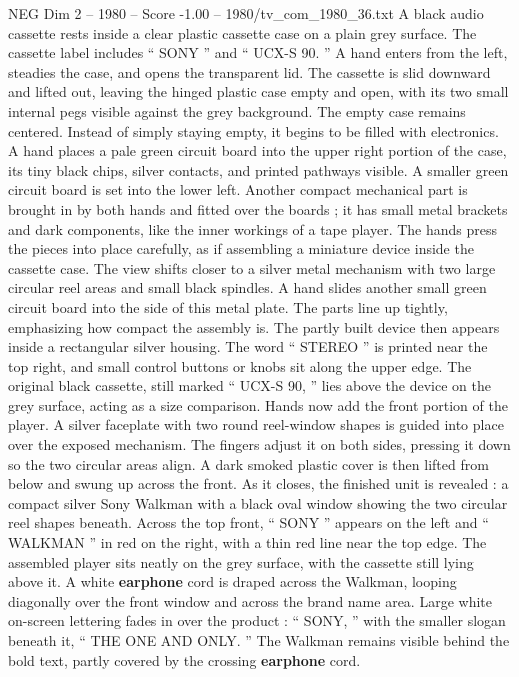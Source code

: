 \begin{textsample}{NEG Dim 2 – 1980 – Score -1.00 – 1980/tv\_com\_1980\_36.txt}  \label{ex:f2_neg_034}
A black audio cassette rests inside a clear plastic cassette case on a plain grey surface.
The cassette label includes “ SONY ” and “ UCX-S 90. ” A hand enters from the left, steadies the case, and opens the transparent lid.
The cassette is slid downward and lifted out, leaving the hinged plastic case empty and open, with its two small internal pegs visible against the grey background.
The empty case remains centered.
Instead of simply staying empty, it begins to be filled with electronics.
A hand places a pale green circuit board into the upper right portion of the case, its tiny black chips, silver contacts, and printed pathways visible.
A smaller green circuit board is set into the lower left.
Another compact mechanical part is brought in by both hands and fitted over the boards ; it has small metal brackets and dark components, like the inner workings of a tape player.
The hands press the pieces into place carefully, as if assembling a miniature device inside the cassette case.
The view shifts closer to a silver metal mechanism with two large circular reel areas and small black spindles.
A hand slides another small green circuit board into the side of this metal plate.
The parts line up tightly, emphasizing how compact the assembly is.
The partly built device then appears inside a rectangular silver housing.
The word “ STEREO ” is printed near the top right, and small control buttons or knobs sit along the upper edge.
The original black cassette, still marked “ UCX-S 90, ” lies above the device on the grey surface, acting as a size comparison.
Hands now add the front portion of the player.
A silver faceplate with two round reel-window shapes is guided into place over the exposed mechanism.
The fingers adjust it on both sides, pressing it down so the two circular areas align.
A dark smoked plastic cover is then lifted from below and swung up across the front.
As it closes, the finished unit is revealed : a compact silver Sony Walkman with a black oval window showing the two circular reel shapes beneath.
Across the top front, “ SONY ” appears on the left and “ WALKMAN ” in red on the right, with a thin red line near the top edge.
The assembled player sits neatly on the grey surface, with the cassette still lying above it.
A white \textbf{earphone} cord is draped across the Walkman, looping diagonally over the front window and across the brand name area.
Large white on-screen lettering fades in over the product : “ SONY, ” with the smaller slogan beneath it, “ THE ONE AND ONLY. ” The Walkman remains visible behind the bold text, partly covered by the crossing \textbf{earphone} cord.

\end{textsample}
